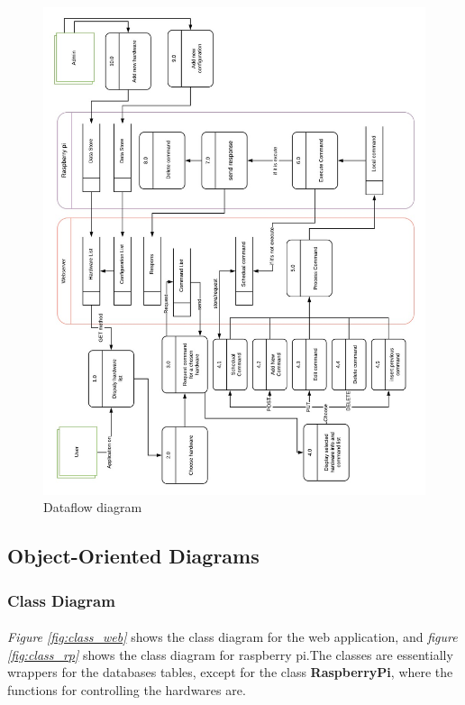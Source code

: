 \documentclass[12pt, oneside, a4paper]{book}
\begin{document}
				\begin{figure}[H]
					\includegraphics[width=\linewidth]{img/diagram_dataflow.jpg}
					\caption{Dataflow diagram}
				\end{figure}
				\newpage\subsection{Object-Oriented Diagrams}
				\subsubsection{Class Diagram}
					\paragraph{} \textit{Figure \ref{fig:class_web}} shows the class diagram for the web application, and \textit{figure \ref{fig:class_rp}} shows the class diagram for raspberry pi.The classes are essentially wrappers for the databases tables, except for the class \textbf{RaspberryPi}, where the functions for controlling the hardwares are.
\end{document}
